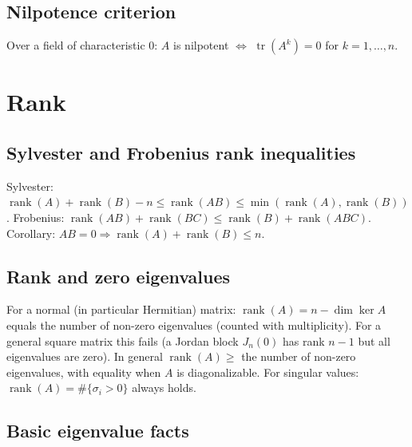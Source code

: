 \subsection{Nilpotence criterion}
\label{subsec:nilpotence-criterion}

Over a field of characteristic $0$: $A$ is nilpotent $\iff$ $\operatorname{tr}(A^k)=0$ for $k=1,\dots,n$.

\medskip

\section{Rank}
\label{sec:rank}

\subsection{Sylvester and Frobenius rank inequalities}
\label{subsec:rank-inequalities}

Sylvester: $\operatorname{rank}(A)+\operatorname{rank}(B)-n\le\operatorname{rank}(AB)\le\min(\operatorname{rank}(A),\operatorname{rank}(B))$.
Frobenius: $\operatorname{rank}(AB)+\operatorname{rank}(BC)\le\operatorname{rank}(B)+\operatorname{rank}(ABC)$.
Corollary: $AB=0\Rightarrow\operatorname{rank}(A)+\operatorname{rank}(B)\le n$.

\subsection{Rank and zero eigenvalues}
\label{subsec:rank-zero-eigenvalues}

For a normal (in particular Hermitian) matrix: $\operatorname{rank}(A)=n-\dim\ker A$ equals the number of non-zero eigenvalues (counted with multiplicity). For a general square matrix this fails (a Jordan block $J_n(0)$ has rank $n-1$ but all eigenvalues are zero). In general $\operatorname{rank}(A)\ge$ the number of non-zero eigenvalues, with equality when $A$ is diagonalizable. For singular values: $\operatorname{rank}(A)=\#\{\sigma_i>0\}$ always holds.

\subsection{Basic eigenvalue facts}
\label{subsec:eigenvalue-facts}

